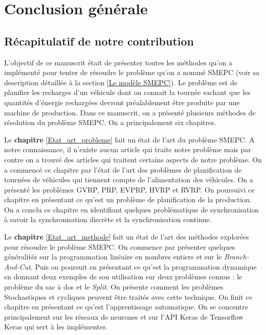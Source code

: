 	\chapter{Conclusion générale}
	\minitoc
	\newpage
	 \label{conclusion-fin}
	\section{Récapitulatif de notre contribution}
	
	L'objectif de ce manuscrit était de présenter toutes les méthodes qu'on a implémenté pour tenter de résoudre le problème qu'on a nommé SMEPC (voir sa description détaillée à la section \ref{Le modèle SMEPC}). Le problème est de planifier les recharges d'un véhicule dont on connait la tournée sachant que les quantités d'énergie rechargées devront préalablement être produite par une machine de production. 
	Dans ce manuscrit, on a présenté plusieurs méthodes de résolution du problème SMEPC. On a principalement six chapitres. 
	
	Le \textbf{chapitre} \ref{Etat_art_probleme} fait un état de l'art du problème SMEPC. A notre connaissance, il n'existe aucun article qui traite notre problème mais par contre on a trouvé des articles qui traitent certains aspects de notre problème. On a commencé ce chapitre par l'état de l'art des problèmes de planification de tournées de véhicules qui tiennent compte de l'alimentation des véhicules. On a présenté les problèmes GVRP, PRP, EVPRP, HVRP et RVRP. On poursuivi ce chapitre en présentant ce qu'est un problème de planification de la production. On a conclu ce chapitre en identifiant quelques problématique de synchronisation à savoir la synchronisation discrète et la synchronisation continue.
	
	Le \textbf{chapitre} \ref{Etat_art_methode} fait un état de l'art des méthodes explorées pour résoudre le problème SMEPC. On commence par présenter quelques généralités sur la programmation linéaire en nombres entiers et sur le \textit{Branch-And-Cut}. Puis on poursuit en présentant ce qu'est la programmation dynamique en donnant deux exemples de son utilisation sur deux problèmes connus : le problème du sac à dos et le \textit{Split}. On présente comment les problèmes Stochastiques et cycliques peuvent être traités avec cette technique. On finit ce chapitre en présentant ce qu'est l'apprentissage automatique. On se concentre principalement sur les réseaux de neurones et sur l'API Keras de Tensorflow Keras  qui sert à les implémenter.
	
